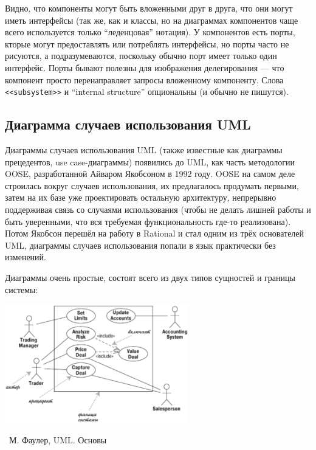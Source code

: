 \documentclass[a5paper]{article}
\newcommand{\attribution}[1] {
	\vspace{-5mm}\begin{flushright}\begin{scriptsize}%
	{\textcopyright\, #1}\end{scriptsize}\end{flushright}
}
\begin{document}
Видно, что компоненты могут быть вложенными друг в друга, что они могут иметь интерфейсы (так же, как и классы, но на диаграммах компонентов чаще всего используется только ``леденцовая'' нотация). У компонентов есть порты, кторые могут предоставлять или потреблять интерфейсы, но порты часто не рисуются, а подразумеваются, поскольку обычно порт имеет только один интерфейс. Порты бывают полезны для изображения делегирования --- что компонент просто перенаправляет запросы вложенному компоненту. Слова \verb|<<subsystem>>| и ``internal structure'' опциональны (и обычно не пишутся).

\subsection{Диаграмма случаев использования UML}

Диаграммы случаев использования UML (также известные как диаграммы прецедентов, use case-диаграммы) появились до UML, как часть методологии OOSE, разработанной Айваром Якобсоном в 1992 году. OOSE на самом деле строилась вокруг случаев использования, их предлагалось продумать первыми, затем на их базе уже проектировать остальную архитектуру, непрерывно поддерживая связь со случаями использования (чтобы не делать лишней работы и быть уверенными, что вся требуемая функциональность где-то реализована). Потом Якобсон перешёл на работу в Rational и стал одним из трёх основателей UML, диаграммы случаев использования попали в язык практически без изменений.

Диаграммы очень простые, состоят всего из двух типов сущностей и границы системы:

\begin{center}
	\includegraphics[width=0.6\textwidth]{useCaseDiagram.png}
	\attribution{М. Фаулер, UML. Основы}
\end{center}
\end{document}
